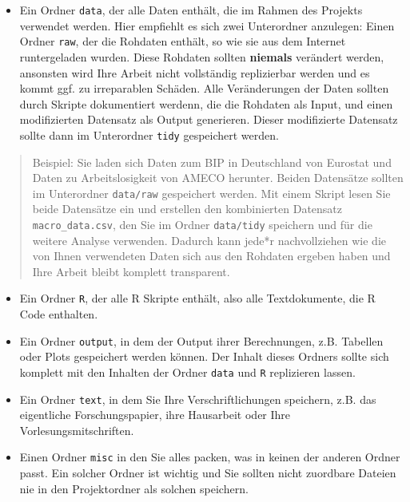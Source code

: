 \documentclass[]{book}
\providecommand{\tightlist}{%
  \setlength{\itemsep}{0pt}\setlength{\parskip}{0pt}}
\begin{document}
\begin{itemize}
\tightlist
\item
  Ein Ordner \texttt{data}, der alle Daten enthält, die im Rahmen des
  Projekts verwendet werden. Hier empfiehlt es sich zwei Unterordner
  anzulegen: Einen Ordner \texttt{raw}, der die Rohdaten enthält, so wie
  sie aus dem Internet runtergeladen wurden. Diese Rohdaten sollten
  \textbf{niemals} verändert werden, ansonsten wird Ihre Arbeit nicht
  vollständig replizierbar werden und es kommt ggf. zu irreparablen
  Schäden. Alle Veränderungen der Daten sollten durch Skripte
  dokumentiert werdenn, die die Rohdaten als Input, und einen
  modifizierten Datensatz als Output generieren. Dieser modifizierte
  Datensatz sollte dann im Unterordner \texttt{tidy} gespeichert werden.
\end{itemize}

\begin{quote}
Beispiel: Sie laden sich Daten zum BIP in Deutschland von Eurostat und
Daten zu Arbeitslosigkeit von AMECO herunter. Beiden Datensätze sollten
im Unterordner \texttt{data/raw} gespeichert werden. Mit einem Skript
lesen Sie beide Datensätze ein und erstellen den kombinierten Datensatz
\texttt{macro\_data.csv}, den Sie im Ordner \texttt{data/tidy} speichern
und für die weitere Analyse verwenden. Dadurch kann jede*r
nachvollziehen wie die von Ihnen verwendeten Daten sich aus den Rohdaten
ergeben haben und Ihre Arbeit bleibt komplett transparent.
\end{quote}

\begin{itemize}
\item
  Ein Ordner \texttt{R}, der alle R Skripte enthält, also alle
  Textdokumente, die R Code enthalten.
\item
  Ein Ordner \texttt{output}, in dem der Output ihrer Berechnungen, z.B.
  Tabellen oder Plots gespeichert werden können. Der Inhalt dieses
  Ordners sollte sich komplett mit den Inhalten der Ordner \texttt{data}
  und \texttt{R} replizieren lassen.
\item
  Ein Ordner \texttt{text}, in dem Sie Ihre Verschriftlichungen
  speichern, z.B. das eigentliche Forschungspapier, ihre Hausarbeit oder
  Ihre Vorlesungsmitschriften.
\item
  Einen Ordner \texttt{misc} in den Sie alles packen, was in keinen der
  anderen Ordner passt. Ein solcher Ordner ist wichtig und Sie sollten
  nicht zuordbare Dateien nie in den Projektordner als solchen
  speichern.
\end{itemize}
\end{document}
